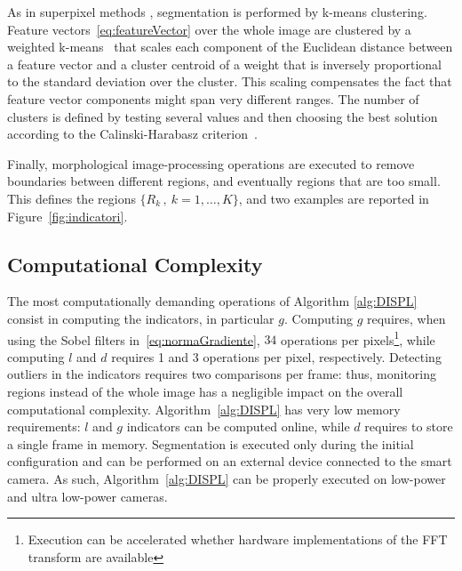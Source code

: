 \documentclass{llncs}
\newcommand{\gi}[1]{{\textcolor{red}{[\small \textbf{Giacomo}: #1]}}}
\begin{document}
As in superpixel methods \cite{Susstrunk2012}, segmentation is performed by k-means clustering. Feature vectors~\eqref{eq:featureVector} over the whole image are clustered by a weighted k-means~\cite{kottke1994motion} that scales each component of the Euclidean distance between a feature vector and a cluster centroid of a weight that is inversely proportional to the standard deviation over the cluster. This scaling compensates the fact that feature vector components might span very different ranges. The number of clusters is defined by testing several values and then choosing the best solution according to the Calinski-Harabasz criterion~\cite{calinski1974dendrite}.



Finally, morphological image-processing operations are executed to remove boundaries between different regions, and eventually regions that are too small. This defines the regions $\{R_k\,, \ k=1,\dots,K\}$, and two examples are reported in Figure~\ref{fig:indicatori}.

\subsection{Computational Complexity}\label{subsec:coputationalComplexity}

The most computationally demanding operations of Algorithm \ref{alg:DISPL} consist in computing the indicators, in particular $g$. Computing $g$ requires, when using the Sobel filters in~\eqref{eq:normaGradiente}, $34$ operations per pixels\footnote{Execution can be accelerated whether hardware implementations of the FFT transform are available}, while computing $l$ and $d$ requires 1 and 3 operations per pixel, respectively. Detecting outliers in the indicators requires two comparisons per frame: thus, monitoring regions instead of the whole image has a negligible impact on the overall computational complexity. Algorithm~\ref{alg:DISPL} has very low memory requirements: $l$ and $g$ indicators can be computed online, while $d$ requires to store a single frame in memory. Segmentation is executed only during the initial configuration and can be performed on an external device connected to the smart camera. As such, Algorithm~\ref{alg:DISPL} can be properly executed on low-power and ultra low-power cameras.
\vspace{-0.2cm}
\end{document}
